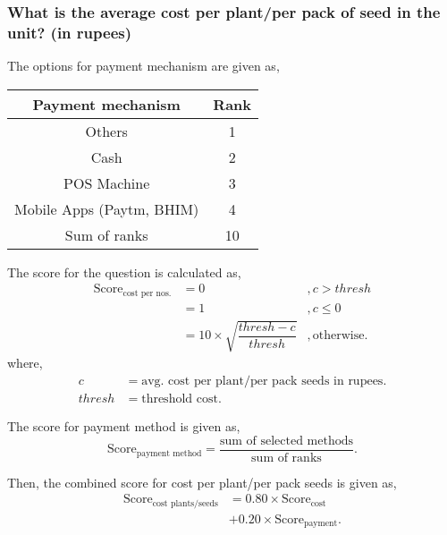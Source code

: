 \documentclass[oneside,twocolumn]{article}
\newcommand{\tsub}[2]{\text{#1}_{\text{#2}}}
\newcommand{\dsub}[2]{\dfrac{\text{#1}}{\text{#2}}}
\newenvironment{ttable}
               {
                 \begin{center}
                   \begin{tabular}{c|c}
                     \hline
               }
               {
                 \\ \hline
                   \end{tabular}
                 \end{center}
               }
\begin{document}
               \subsubsection{What is the average cost per plant/per pack of seed in the unit? (in rupees)}
               The options for payment mechanism are given as,
               \begin{ttable}
                 Payment mechanism & Rank \\ \hline
                 Others & 1 \\
                 Cash & 2 \\
                 POS Machine & 3 \\
                 Mobile Apps (Paytm, BHIM) & 4 \\ \hline
                 Sum of ranks & 10
               \end{ttable}

               The score for the question is calculated as,
               \begin{align*}
                 \tsub{Score}{cost per nos.} &= 0 &, c > thresh \\
                 &= 1 &, c \le 0 \\
                 &= 10 \times \sqrt{\dfrac{thresh - c}{thresh}} &, \text{otherwise}.
               \end{align*}
               where,
               \begin{align*}
                 c &= \text{avg. cost per plant/per pack seeds in rupees}. \\
                 thresh &= \text{threshold cost}.
               \end{align*}

               The score for payment method is given as,
               \[
               \tsub{Score}{payment method} = \dsub{sum of selected methods}{sum of ranks}.
               \]

               Then, the combined score for cost per plant/per pack seeds is given as,
               \begin{align*}
                 \tsub{Score}{cost plants/seeds} &= 0.80 \times \tsub{Score}{cost} \\
                 &+ 0.20 \times \tsub{Score}{payment}.
               \end{align*}
\end{document}
